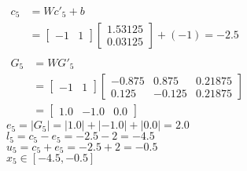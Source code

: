 {{                $\begin{aligned}
                    c_5 &= W c'_5 + b \\
                    &= \begin{bmatrix} -1 & 1 \end{bmatrix} \begin{bmatrix} 1.53125 \\ 0.03125 \end{bmatrix} + (-1) = -2.5 \\
                \end{aligned}$ \\
                $\begin{aligned}
                    G_5 &= W G'_5 \\
                    &= \begin{bmatrix} -1 & 1 \end{bmatrix} \begin{bmatrix} -0.875 & 0.875 & 0.21875 \\ 0.125 & -0.125 & 0.21875 \end{bmatrix} \\
                    &= \begin{bmatrix} 1.0 & -1.0 & 0.0 \end{bmatrix}
                \end{aligned}$ \\
                $e_5 = |G_5| = |1.0| + |-1.0| + |0.0| = 2.0$ \\
                $l_5 = c_5 - e_5 = -2.5 - 2 = -4.5$ \\
                $u_5 = c_5 + e_5 = -2.5 + 2 = -0.5$ \\
                $\boxed{x_5 \in [-4.5, -0.5]}$
            }
        \fi
    \fi
}


